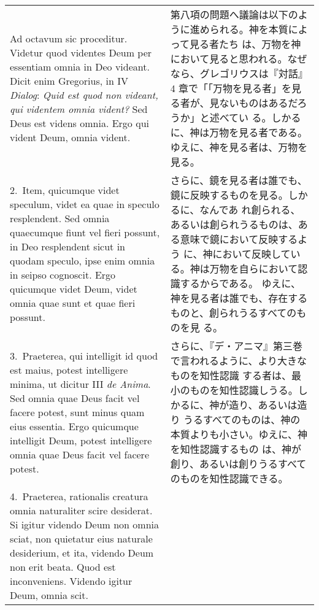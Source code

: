 \documentclass[10pt]{jsarticle} %
\begin{document}
\begin{longtable}{p{21em}p{21em}}

{\sc Ad octavum sic proceditur}. Videtur quod videntes Deum per
essentiam omnia in Deo videant. Dicit enim Gregorius, in IV {\it
Dialog}: {\it Quid est quod non videant, qui videntem omnia vident?}
Sed Deus est videns omnia. Ergo qui vident Deum, omnia vident.

&

第八項の問題へ議論は以下のように進められる。神を本質によって見る者たち
は、万物を神において見ると思われる。なぜなら、グレゴリウスは『対話』4
章で「「万物を見る者」を見る者が、見ないものはあるだろうか」と述べてい
る。しかるに、神は万物を見る者である。ゆえに、神を見る者は、万物を見る。

\\


2.~{\sc Item}, quicumque videt speculum, videt ea quae in speculo
resplendent. Sed omnia quaecumque fiunt vel fieri possunt, in Deo
resplendent sicut in quodam speculo, ipse enim omnia in seipso
cognoscit. Ergo quicumque videt Deum, videt omnia quae sunt et quae
fieri possunt.

&

さらに、鏡を見る者は誰でも、鏡に反映するものを見る。しかるに、なんであ
れ創られる、あるいは創られうるものは、ある意味で鏡において反映するよう
に、神において反映している。神は万物を自らにおいて認識するからである。
ゆえに、神を見る者は誰でも、存在するものと、創られうるすべてのものを見
る。

\\


3.~{\sc Praeterea}, qui intelligit id quod est maius, potest
intelligere minima, ut dicitur III {\it de Anima}. Sed omnia quae Deus
facit vel facere potest, sunt minus quam eius essentia. Ergo quicumque
intelligit Deum, potest intelligere omnia quae Deus facit vel facere
potest.

&

さらに、『デ・アニマ』第三巻で言われるように、より大きなものを知性認識
する者は、最小のものを知性認識しうる。しかるに、神が造り、あるいは造り
うるすべてのものは、神の本質よりも小さい。ゆえに、神を知性認識するもの
は、神が創り、あるいは創りうるすべてのものを知性認識できる。

\\

4.~{\sc Praeterea}, rationalis creatura omnia naturaliter scire
desiderat. Si igitur videndo Deum non omnia sciat, non quietatur eius
naturale desiderium, et ita, videndo Deum non erit beata. Quod est
inconveniens. Videndo igitur Deum, omnia scit.


\end{longtable}
\end{document}
